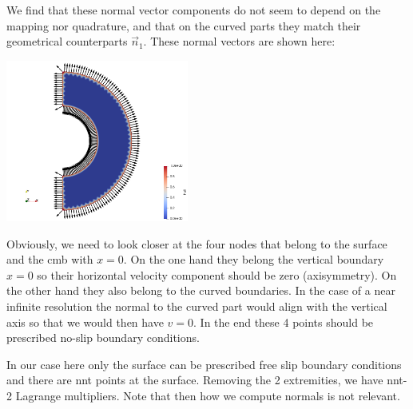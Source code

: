 We find that these normal vector components do not seem to depend on the mapping nor quadrature,
and that on the curved parts they match their geometrical counterparts $\vec{n}_1$.
These normal vectors are shown here:

\begin{center}
\includegraphics[width=6cm]{python_codes/fieldstone_152/results/normals/normals}
\end{center}

Obviously, we need to look closer at the four nodes that belong to the surface and the cmb with $x=0$.
On the one hand they belong the vertical boundary $x=0$ so their horizontal velocity component should be zero (axisymmetry).
On the other hand they also belong to the curved boundaries. In the case of a near infinite resolution the 
normal to the curved part would align with the vertical axis so that we would then have $v=0$. 
In the end these 4 points should be prescribed no-slip boundary conditions.

In our case here only the surface can be prescribed free slip boundary conditions and there are {\python nnt} points at the surface.
Removing the 2 extremities, we have {\python nnt-2} Lagrange multipliers. Note that then how we compute normals is not relevant.

